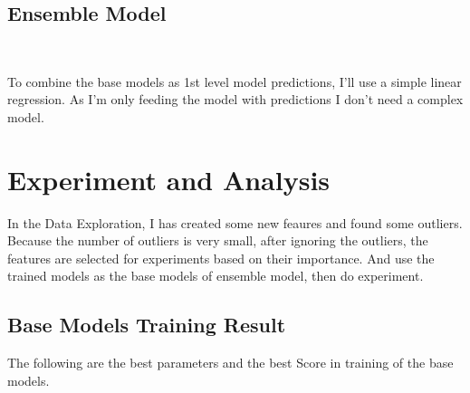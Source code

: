 \subsection{Ensemble Model}
\

To combine the base models as 1st level 
model predictions, I'll use a simple 
linear regression. As I'm only feeding 
the model with predictions 
I don't need a complex model.

\section{Experiment and Analysis}

In the Data Exploration, 
I has created some new feaures 
and found some outliers.
Because the number of outliers is very small, 
after ignoring the outliers, the features 
are selected for experiments based on their importance.
And use the trained models as 
the base models of ensemble model,
then do experiment.

\subsection{Base Models Training Result}

The following are the best parameters and 
the best Score in training of 
the base models. 

